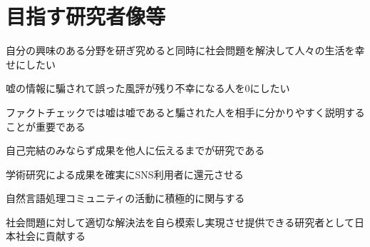 
\section{目指す研究者像等}

\noindent
{}

自分の興味のある分野を研ぎ究めると同時に社会問題を解決して人々の生活を幸せにしたい

嘘の情報に騙されて誤った風評が残り不幸になる人を0にしたい

ファクトチェックでは嘘は嘘であると騙された人を相手に分かりやすく説明することが重要である

自己完結のみならず成果を他人に伝えるまでが研究である


\vspace{5mm}
\noindent
{}

学術研究による成果を確実にSNS利用者に還元させる

自然言語処理コミュニティの活動に積極的に関与する

社会問題に対して適切な解決法を自ら模索し実現させ提供できる研究者として日本社会に貢献する



